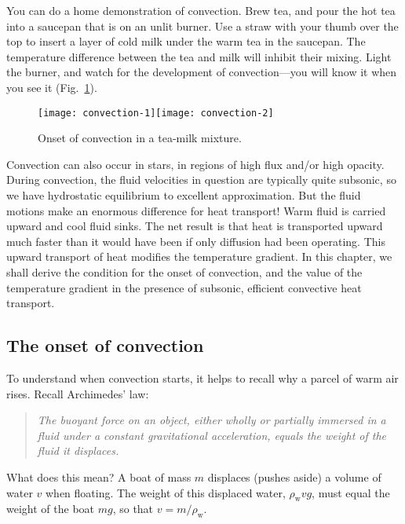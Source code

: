 You can do a home demonstration of convection.  Brew tea, and pour the hot tea into a saucepan that is on an unlit burner. Use a straw with your thumb over the top to insert a layer of cold milk under the warm tea in the saucepan. The temperature difference between the tea and milk will inhibit their mixing. Light the burner, and watch for the development of convection---you will know it when you see it (Fig.~\ref{f.tea}).

\begin{figure}[htbp]
\texttt{[image: convection-1]}\texttt{[image: convection-2]}
\caption{Onset of convection in a tea-milk mixture.\label{f.tea}}
\end{figure}

Convection can also occur in stars, in regions of high flux and/or high opacity. During convection, the fluid velocities in question are typically quite subsonic, so we have hydrostatic equilibrium to excellent approximation. But the fluid motions make an enormous difference for heat transport! Warm fluid is carried upward and cool fluid sinks. The net result is that heat is transported upward much faster than it would have been if only diffusion had been operating. This upward transport of heat modifies the temperature gradient. In this chapter, we shall derive the condition for the onset of convection, and the value of the temperature gradient in the presence of subsonic, efficient convective heat transport.

\subsection{The onset of convection}\label{s.convection-onset}

To understand when convection starts, it helps to recall why a parcel of warm air rises. Recall Archimedes' law:
\begin{quote}\itshape
The buoyant force on an object, either wholly or partially immersed in a fluid under a constant gravitational acceleration, equals the weight of the fluid it displaces.
\end{quote}
What does this mean? A boat of mass $m$ displaces (pushes aside) a volume of water $v$ when floating. The weight of this displaced water, $\rho_{\mathrm{w}}v g$, must equal the weight of the boat $mg$, so that $v = m/\rho_{\mathrm{w}}$.

